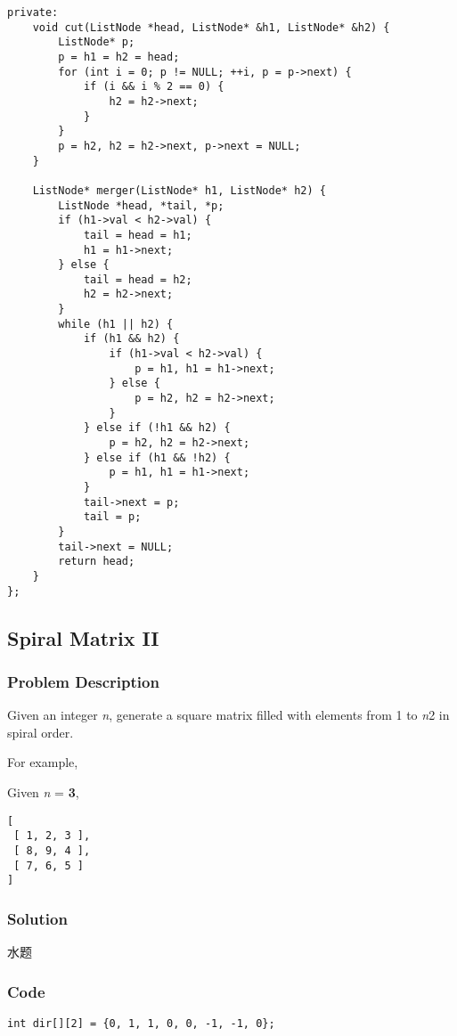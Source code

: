 \documentclass[courier]{article}
\begin{document}
\begin{CJK*}{UTF8}{gkai}
\begin{lstlisting}
private:
    void cut(ListNode *head, ListNode* &h1, ListNode* &h2) {
        ListNode* p;
        p = h1 = h2 = head;
        for (int i = 0; p != NULL; ++i, p = p->next) {
            if (i && i % 2 == 0) {
                h2 = h2->next;
            }
        }
        p = h2, h2 = h2->next, p->next = NULL;
    }
    
    ListNode* merger(ListNode* h1, ListNode* h2) {
        ListNode *head, *tail, *p;
        if (h1->val < h2->val) {
            tail = head = h1;
            h1 = h1->next;
        } else {
            tail = head = h2;
            h2 = h2->next;
        }
        while (h1 || h2) {
            if (h1 && h2) {
                if (h1->val < h2->val) {
                    p = h1, h1 = h1->next;
                } else {
                    p = h2, h2 = h2->next;
                }
            } else if (!h1 && h2) {
                p = h2, h2 = h2->next;
            } else if (h1 && !h2) {
                p = h1, h1 = h1->next;
            }
            tail->next = p;
            tail = p;
        }
        tail->next = NULL;
        return head;
    }
}; 
\end{lstlisting}


\subsection{ Spiral Matrix II }

\subsubsection*{Problem Description}
Given an integer \emph{n}, generate a square matrix filled with elements from 1 to \emph{n}2 in spiral order.

For example,


Given \emph{n} = \textbf{3},

\begin{verbatim}
[
 [ 1, 2, 3 ],
 [ 8, 9, 4 ],
 [ 7, 6, 5 ]
]
\end{verbatim}


\subsubsection*{Solution}
水题

\subsubsection*{Code}
\begin{lstlisting}
int dir[][2] = {0, 1, 1, 0, 0, -1, -1, 0};


\end{lstlisting}
\end{CJK*}
\end{document}
